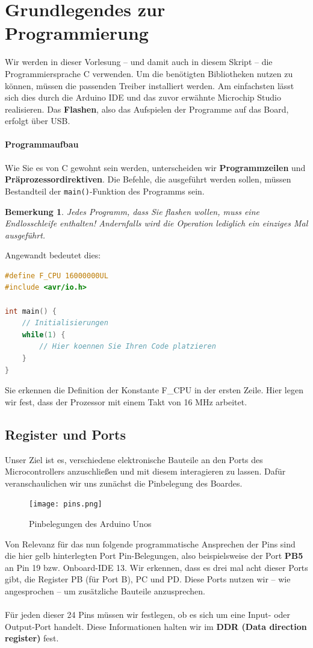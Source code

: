 \documentclass[11pt,a4paper]{scrartcl}
\newtheorem{note}{Bemerkung}
\begin{document}
\section{Grundlegendes zur Programmierung}
Wir werden in dieser Vorlesung -- und damit auch in diesem Skript -- die Programmiersprache C verwenden. Um die benötigten Bibliotheken nutzen zu können, müssen die passenden Treiber installiert werden. Am einfachsten lässt sich dies durch die Arduino IDE und das zuvor erwähnte Microchip Studio realisieren. Das \textbf{Flashen}, also das Aufspielen der Programme auf das Board, erfolgt über USB.
\paragraph{Programmaufbau}
Wie Sie es von C gewohnt sein werden, unterscheiden wir \textbf{Programmzeilen} und \textbf{Präprozessordirektiven}. Die Befehle, die ausgeführt werden sollen, müssen Bestandteil der \texttt{main()}-Funktion des Programms sein.
\begin{note}
Jedes Programm, dass Sie flashen wollen, muss eine Endlosschleife enthalten! Andernfalls wird die Operation lediglich ein einziges Mal ausgeführt.
\end{note} 
Angewandt bedeutet dies:
\begin{lstlisting}[language=C]
#define F_CPU 16000000UL
#include <avr/io.h>

int main() {
	// Initialisierungen
	while(1) {
		// Hier koennen Sie Ihren Code platzieren	
	}
}
\end{lstlisting}
Sie erkennen die Definition der Konstante F{\_}CPU in der ersten Zeile. Hier legen wir fest, dass der Prozessor mit einem Takt von 16 MHz arbeitet.
\subsection{Register und Ports}
Unser Ziel ist es, verschiedene elektronische Bauteile an den Ports des Microcontrollers anzuschließen und mit diesem interagieren zu lassen. Dafür veranschaulichen wir uns zunächst die Pinbelegung des Boardes.
\begin{figure}[h!]
\centering
\texttt{[image: pins.png]}\label{pins}
\caption{Pinbelegungen des Arduino Unos}
\end{figure}
Von Relevanz für das nun folgende programmatische Ansprechen der Pins sind die hier gelb hinterlegten {\glqq}Port Pin{\grqq}-Belegungen, also beispielsweise der Port \textbf{PB5} an Pin 19 bzw. Onboard-IDE 13. Wir erkennen, dass es drei mal acht dieser Ports gibt, die Register PB (für Port B), PC und PD. Diese Ports nutzen wir -- wie angesprochen -- um zusätzliche Bauteile anzusprechen. \\\\
Für jeden dieser 24 Pins müssen wir festlegen, ob es sich um eine Input- oder Output-Port handelt. Diese Informationen halten wir im \textbf{DDR (Data direction register)} fest.
\end{document}

